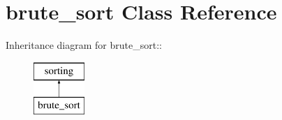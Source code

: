 \hypertarget{classbrute__sort}{
\section{brute\_\-sort Class Reference}
\label{d3/d39/classbrute__sort}
}
Inheritance diagram for brute\_\-sort::\begin{figure}[H]
\begin{center}
\leavevmode
\includegraphics[height=2cm]{d3/d39/classbrute__sort}
\end{center}
\end{figure}
